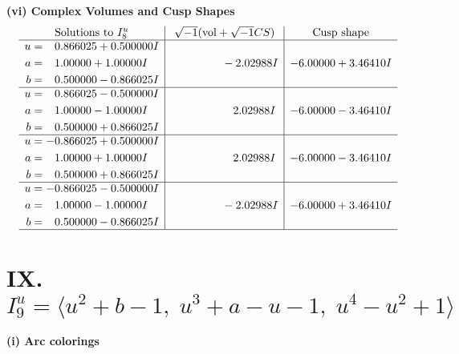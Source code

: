 \documentclass[1p]{elsarticle_modified}
\theoremstyle{definition}
\newcommand{\I}{\sqrt{-1}}
\begin{document}
\newpage\flushleft \textbf{(vi) Complex Volumes and Cusp Shapes}
$$\begin{array}{c|c|c}  
\text{Solutions to }I^u_{8}& \I (\text{vol} + \sqrt{-1}CS) & \text{Cusp shape}\\
 \hline 
\begin{aligned}
u &= \phantom{-}0.866025 + 0.500000 I \\
a &= \phantom{-}1.00000 + 1.00000 I \\
b &= \phantom{-}0.500000 - 0.866025 I\end{aligned}
 & \phantom{-0.000000 } -2.02988 I & -6.00000 + 3.46410 I \\ \hline\begin{aligned}
u &= \phantom{-}0.866025 - 0.500000 I \\
a &= \phantom{-}1.00000 - 1.00000 I \\
b &= \phantom{-}0.500000 + 0.866025 I\end{aligned}
 & \phantom{-0.000000 -}2.02988 I & -6.00000 - 3.46410 I \\ \hline\begin{aligned}
u &= -0.866025 + 0.500000 I \\
a &= \phantom{-}1.00000 + 1.00000 I \\
b &= \phantom{-}0.500000 + 0.866025 I\end{aligned}
 & \phantom{-0.000000 -}2.02988 I & -6.00000 - 3.46410 I \\ \hline\begin{aligned}
u &= -0.866025 - 0.500000 I \\
a &= \phantom{-}1.00000 - 1.00000 I \\
b &= \phantom{-}0.500000 - 0.866025 I\end{aligned}
 & \phantom{-0.000000 } -2.02988 I & -6.00000 + 3.46410 I\\
 \hline 
 \end{array}$$\newpage\newpage\renewcommand{\arraystretch}{1}
\centering \section*{IX. $I^u_{9}= \langle u^2+b-1,\;u^3+a- u-1,\;u^4- u^2+1 \rangle$}
\flushleft \textbf{(i) Arc colorings}\\
\end{document}
